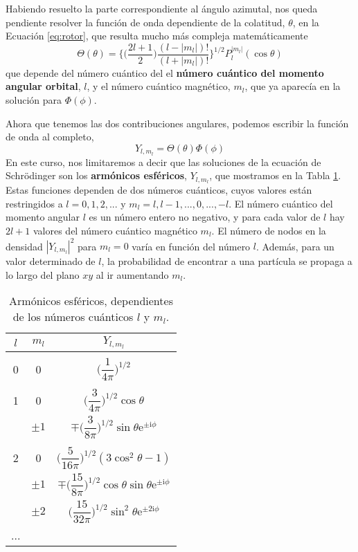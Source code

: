 Habiendo resuelto la parte correspondiente al ángulo 
azimutal, nos queda pendiente resolver la función de onda
dependiente de la colatitud, $\theta$, en la Ecuación
\ref{eq:rotor}, que resulta mucho más compleja 
matemáticamente
\begin{equation}
    \Theta(\theta)=\bigg\{ 
    \bigg(
    \frac{2l+1}{2}
    \bigg)
    \frac{(l-|m_l|)!}{(l+|m_l|)!}
    \bigg\}^{1/2}
    P_l^{|m_l|}(\cos\theta)
\end{equation}
que depende del número cuántico del el \textbf{número 
cuántico del momento angular orbital}, $l$, y el número cuántico magnético, $m_l$, que ya aparecía en la solución
para $\Phi(\phi)$. 

Ahora que tenemos las dos contribuciones angulares, 
podemos escribir la función de onda al completo,
\begin{equation}
    Y_{l,m_l}=\Theta(\theta)\Phi(\phi)
\end{equation}
En este curso, nos limitaremos a decir que las 
soluciones de la ecuación de Schrödinger son los
\textbf{armónicos esféricos}, $Y_{l,m_l}$, 
que mostramos en la Tabla \ref{tb:legendre}. Estas 
funciones dependen de dos números cuánticos, cuyos 
valores están restringidos a $l=0,1,2,...$ y 
$m_l=l, l-1,...,0,...,-l$. El número cuántico del 
momento angular $l$ es un número entero no negativo, y 
para cada valor de $l$ hay $2l+1$ valores del número 
cuántico magnético $m_l$. El número de nodos en la 
densidad $|Y_{l,m_l}|^2$ para $m_l=0$ varía en función 
del número $l$. Además, para un valor determinado de $l$,
la probabilidad de encontrar a una partícula se propaga 
a lo largo del plano $xy$ al ir aumentando $m_l$.

\begin{table}[t!]
    \centering
    \begin{tabular}{c|c|c}
     $l$ & $m_l$ & $ Y_{l,m_l}$ \\
     \hline
     & & \\
    0 & 0       & $\bigg(\dfrac{1}{4\pi}\bigg)^{1/2}$\\ 
     & & \\
    1 & 0       & $\bigg(\dfrac{3}{4\pi}\bigg)^{1/2}\cos{\theta}$ \\ 
      & $\pm 1$ & $\mp\bigg(\dfrac{3}{8\pi}\bigg)^{1/2}\sin{\theta}\mathrm{e}^{\pm \mathrm{i}\phi}$ \\ 
     & & \\
    2 & 0       & $\bigg(\dfrac{5}{16\pi}\bigg)^{1/2}(3\cos^2\theta-1)$ \\ 
      & $\pm 1$  & $\mp\bigg(\dfrac{15}{8\pi}\bigg)^{1/2}\cos\theta\sin\theta\mathrm{e}^{\pm \mathrm{i}\phi}$  \\ 
      & $\pm 2$  & $\bigg(\dfrac{15}{32\pi}\bigg)^{1/2}\sin^2\theta\mathrm{e}^{\pm 2\mathrm{i}\phi}$ \\ 
    ... &  &
    \end{tabular}
    \caption{Armónicos esféricos, dependientes de los números
    cuánticos $l$ y $m_l$.}
    \label{tb:legendre}
\end{table}

